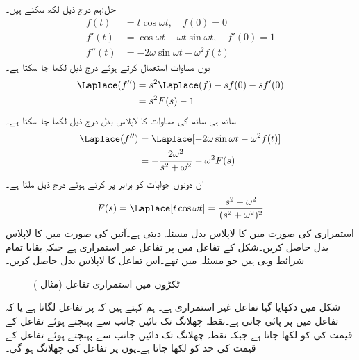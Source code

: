 حل:ہم درج ذیل لکھ سکتے ہیں۔
\begin{align*}
f(t)&=t\cos \omega t, \quad f(0)=0\\
f'(t)&=\cos \omega t-\omega t\sin \omega t, \quad f'(0)=1\\
f''(t)&=-2\omega \sin \omega t-\omega^2 f(t)
\end{align*}
یوں مساوات  استعمال کرتے ہوئے درج ذیل لکھا جا سکتا ہے۔
\begin{align*}
\Laplace(f'')&=s^2\Laplace(f)-sf(0)-sf'(0)\\
&=s^2F(s)-1
\end{align*}
ساتھ ہی ساتھ  کی مساوات کا لاپلاس بدل درج ذیل لکھا جا سکتا ہے۔
\begin{align*}
\Laplace(f'')&=\Laplace[-2\omega \sin \omega t-\omega^2 f(t)]\\
&=-\frac{2\omega^2}{s^2+\omega^2}-\omega^2F(s)
\end{align*}
ان دونوں جوابات کو برابر پر کرتے ہوئے درج ذیل ملتا ہے۔
\begin{align}\label{مساوات-لاپلاس_کوسائن_ضرب_وقت}
F(s)=\Laplace[t\cos \omega t]=\frac{s^2-\omega^2}{(s^2+\omega^2)^2}
\end{align}
استمراری  کی صورت میں   کا لاپلاس بدل مسئلہ  دیتی ہے۔آئیں   کی صورت میں  کا لاپلاس بدل حاصل کریں۔شکل  کے تفاعل میں  پر تفاعل غیر استمراری ہے جبکہ بقایا تمام شرائط وہی ہیں جو مسئلہ  میں تھے۔اس تفاعل کا لاپلاس بدل حاصل کریں۔
\begin{figure}
\centering
{}
\caption{ٹکڑوں میں استمراری تفاعل (مثال )}
\label{شکل_مثال_لاپلاس_ٹکڑوں_میں_استمراری}
\end{figure}

شکل  میں دکھایا گیا تفاعل  غیر استمراری ہے۔ ہم کہتے ہیں کہ  پر تفاعل  لگاتا ہے یا کہ تفاعل میں  پر  پائی جاتی ہے۔نقطہ چھلانگ تک بائیں جانب سے پہنچتے ہوئے تفاعل کے قیمت کی  کو  لکھا جاتا ہے جبکہ نقطہ چھلانگ تک دائیں جانب سے پہنچتے ہوئے تفاعل کے قیمت کی حد کو  لکھا جاتا ہے۔یوں  پر تفاعل کی چھلانگ  ہو گی۔

